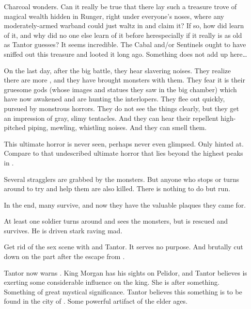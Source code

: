\begin{changes}
    Charcoal wonders. 
    Can it really be true that there lay such a treasure trove of magical wealth hidden in Runger, right under everyone's noses, where any moderately-armed warband could just waltz in and claim it? 
    If so, how did \Takestsha{} learn of it, and why did no one else learn of it before her\dash especially if it really is as old as Tantor guesses? 
    It seems incredible. 
    The Cabal and/or Sentinels ought to have sniffed out this treasure and looted it long ago. 
    Something does not add up here\ldots{} 

    On the last day, after the big battle, they hear slavering noises.
    They realize there are more \meccara, and they have brought monsters with them. 
    They fear it is their gruesome gods (whose images and statues they saw in the big chamber) which have now awakened and are hunting the interlopers. 
    They flee out quickly, pursued by monstrous horrors. 
    They do not see the things clearly, but they get an impression of gray, slimy tentacles. 
    And they can hear their repellent high-pitched piping, mewling, whistling noises.
    And they can smell them.
    
    This ultimate horror is never seen, perhaps never even glimpsed. 
    Only hinted at.
    Compare to that undescribed ultimate horror that lies beyond the highest peaks in \cite{HPLovecraft:AttheMountainsofMadness}. 
    
    Several stragglers are grabbed by the monsters.
    But anyone who stops or turns around to try and help them are also killed. 
    There is nothing to do but run. 
    
    In the end, many survive, and now they have the valuable plaques they came for. 
    
    At least one soldier turns around and sees the monsters, but is rescued and survives. 
    He is driven stark raving mad. 
    
    Get rid of the sex scene with \Takestsha and Tantor. 
    It serves no purpose. 
    And brutally cut down on the part after the escape from \EreshKal. 
    
    Tantor now warns \Onatol. 
    King Morgan has his sights on Pelidor, and Tantor believes \Takestsha is exerting some considerable influence on the king. 
    She is after something.
    Something of great mystical significance.
    Tantor believes this something is to be found in the city of \Forclin.
    Some powerful artifact of the elder ages.
  
  \begin{comment}

\end{comment}
\end{changes}
